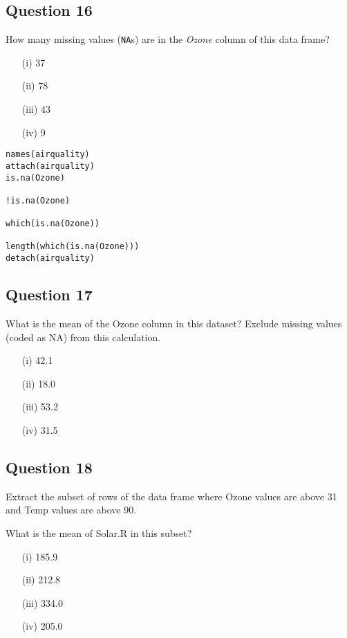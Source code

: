 \documentclass[12pt]{article}
\begin{document}
\subsection*{Question 16}
\Large
How many missing values (\texttt{NA}s) are in the \textit{Ozone} column of this data frame?

\begin{itemize}
	\item[(i)] 37
	\item[(ii)] 78
	\item[(iii)] 43
	\item[(iv)] 9
\end{itemize}

\begin{framed}
\begin{verbatim}
names(airquality)
attach(airquality)
is.na(Ozone)

!is.na(Ozone)

which(is.na(Ozone))

length(which(is.na(Ozone)))
detach(airquality)
\end{verbatim}
\end{framed}
\newpage
\subsection*{Question 17}
\Large
What is the mean of the Ozone column in this dataset? Exclude missing values (coded as NA) from this calculation.

\begin{itemize}
	\item[(i)] 42.1
	\item[(ii)] 18.0
	\item[(iii)] 53.2
	\item[(iv)] 31.5
\end{itemize}



\subsection*{Question 18}
\Large
Extract the subset of rows of the data frame where Ozone values are above 31 and Temp values are above 90. 

What is the mean of Solar.R in this subset?

\begin{itemize}
	\item[(i)] 185.9
	\item[(ii)] 212.8
	\item[(iii)] 334.0
	\item[(iv)] 205.0
\end{itemize}
\newpage
\end{document}
